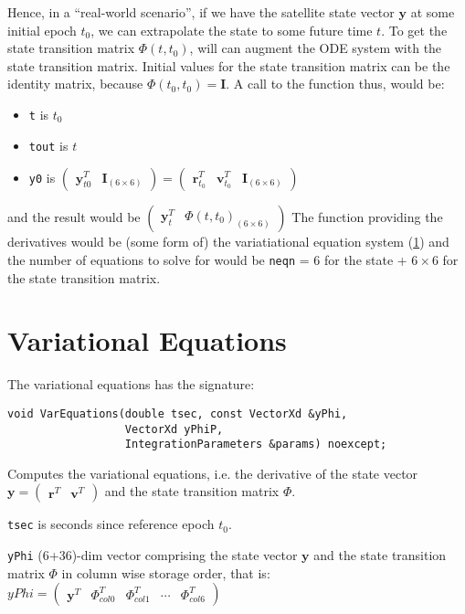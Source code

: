 Hence, in a ``real-world scenario'', if we have the satellite state vector 
$\bm{y}$ at some initial epoch $t_0$, we can extrapolate the state to some 
future time $t$. To get the state transition matrix $\Phi (t,t_0)$, will can 
augment the ODE system with the state transition matrix. Initial values for 
the state transition matrix can be the identity matrix, because 
$\Phi (t_0,t_0) = \bm{I}$. A call to the function thus, would be:
\begin{itemize}
    \item \texttt{t} is $t_0$
    \item \texttt{tout} is $t$
    \item \texttt{y0} is 
    $\begin{pmatrix} \bm{y}^T_{t0} & \bm{I}_{(6 \times 6)} \end{pmatrix} = 
    \begin{pmatrix} \bm{r}^T_{t_0} & \bm{v}^T_{t_0} & \bm{I}_{(6 \times 6)} \end{pmatrix}$
\end{itemize}
and the result would be 
$\begin{pmatrix} \bm{y}^T_{t} & \Phi(t,t_0)_{(6 \times 6)} \end{pmatrix}$
The function providing the derivatives would be (some form of) the 
variatiational equation system (\ref{sec:variational-equations}) and the number 
of equations to solve for would be \texttt{neqn} = $6$ for the state + $6 \times 6$ for 
the state transition matrix.


\section{Variational Equations}
\label{sec:variational-equations}
The variational equations has the signature:

\begin{lstlisting}
void VarEquations(double tsec, const VectorXd &yPhi,
                  VectorXd yPhiP,
                  IntegrationParameters &params) noexcept;
\end{lstlisting}

Computes the variational equations, i.e. the derivative of the state vector 
$\bm{y} = \begin{pmatrix}\bm{r}^T & \bm{v}^T \end{pmatrix}$ and the state 
transition matrix $\Phi$.

\texttt{tsec} is seconds since reference epoch $t_0$.

\texttt{yPhi} (6+36)-dim vector comprising the state vector $\bm{y}$ and the
state transition matrix $\Phi$ in column wise storage order, that is:
$yPhi = \begin{pmatrix}
    \bm{y}^T &  \Phi ^T _{col0} & \Phi ^T _{col1} & \cdots & \Phi^T _{col6}
\end{pmatrix}$

